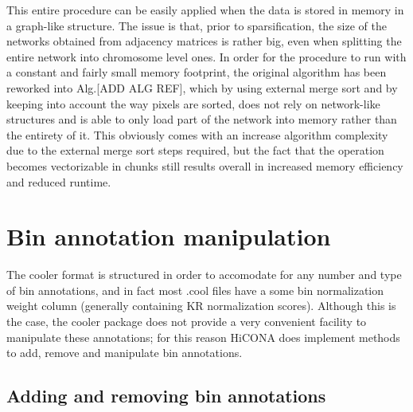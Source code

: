 This entire procedure can be easily applied when the data is stored in memory in a graph-like structure. The issue is that, prior to sparsification, the size of the networks obtained from adjacency matrices is rather big, even when splitting the entire network into chromosome level ones. In order for the procedure to run with a constant and fairly small memory footprint, the original algorithm has been reworked into Alg.[ADD ALG REF], which by using external merge sort and by keeping into account the way pixels are sorted, does not rely on network-like structures and is able to only load part of the network into memory rather than the entirety of it. This obviously comes with an increase algorithm complexity due to the external merge sort steps required, but the fact that the operation becomes vectorizable in chunks still results overall in increased memory efficiency and reduced runtime. 


\section{Bin annotation manipulation}

The cooler format is structured in order to accomodate for any number and type of bin annotations, and in fact most .cool files have a some bin normalization weight column (generally containing KR normalization scores). Although this is the case, the cooler package does not provide a very convenient facility to manipulate these annotations; for this reason HiCONA does implement methods to add, remove and manipulate bin annotations.

\subsection{Adding and removing bin annotations}

